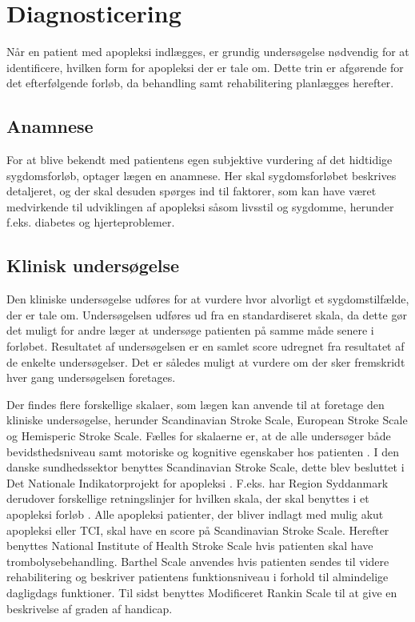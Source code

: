 \section{Diagnosticering}

Når en patient med apopleksi indlægges, er grundig undersøgelse nødvendig for at identificere, hvilken form for apopleksi der er tale om. Dette trin er afgørende for det efterfølgende forløb, da behandling samt rehabilitering planlægges herefter. \cite{Sundhedsstyrelsen2009}

\subsection{Anamnese}
For at blive bekendt med patientens egen subjektive vurdering af det hidtidige sygdomsforløb, optager lægen en anamnese. Her skal sygdomsforløbet  beskrives detaljeret, og der skal desuden spørges ind til faktorer, som kan have været medvirkende til udviklingen af apopleksi såsom livsstil og sygdomme, herunder f.eks. diabetes og hjerteproblemer. \cite{Sundhedsstyrelsen2009}

\subsection{Klinisk undersøgelse}
Den kliniske undersøgelse udføres for at vurdere hvor alvorligt et sygdomstilfælde, der er tale om. Undersøgelsen udføres ud fra en standardiseret skala, da dette gør det muligt for andre læger at undersøge patienten på samme måde senere i forløbet. Resultatet af undersøgelsen er en samlet score udregnet fra resultatet af de enkelte undersøgelser. Det er således muligt at vurdere om der sker fremskridt hver gang undersøgelsen foretages. \cite{Sundhedsstyrelsen2009}

Der findes flere forskellige skalaer, som lægen kan anvende til at foretage den kliniske undersøgelse, herunder Scandinavian Stroke Scale, European Stroke Scale og Hemisperic Stroke Scale. Fælles for skalaerne er, at de alle undersøger både bevidsthedsniveau samt motoriske og kognitive egenskaber hos patienten \cite{Center, Centera, Centerb, Centerc}. I den danske sundhedssektor benyttes Scandinavian Stroke Scale, dette blev besluttet i Det Nationale Indikatorprojekt for apopleksi \cite{Apopleksi2009}. F.eks. har Region Syddanmark derudover forskellige retningslinjer for hvilken skala, der skal benyttes i et apopleksi forløb \cite{Syddanmark}. Alle apopleksi patienter, der bliver indlagt med mulig akut apopleksi eller TCI, skal have en score på Scandinavian Stroke Scale. Herefter benyttes National Institute of Health Stroke Scale hvis patienten skal have trombolysebehandling. Barthel Scale anvendes hvis patienten sendes til videre rehabilitering og beskriver patientens funktionsniveau i forhold til almindelige dagligdags funktioner. Til sidst benyttes Modificeret Rankin Scale til at give en beskrivelse af graden af handicap. \cite{Syddanmark}


